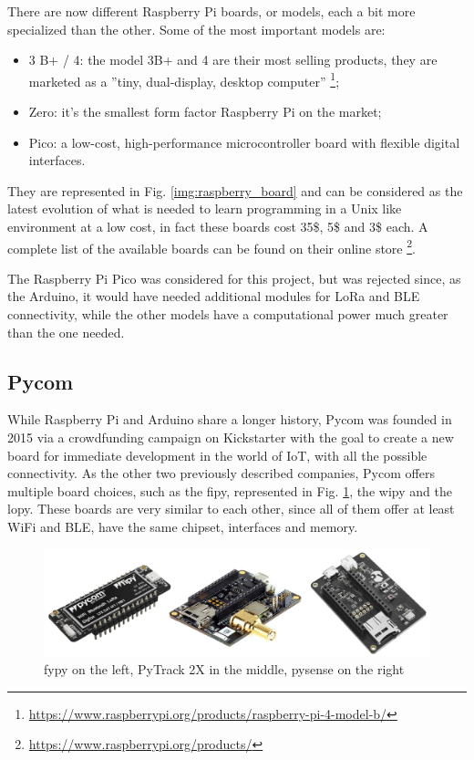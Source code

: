 		There are now different Raspberry Pi boards, or models, each a bit more specialized than the other.
		Some of the most important models are:
		\begin{itemize}[noitemsep]
			\item 3 B+ / 4: the model 3B+ and 4 are their most selling products, they are marketed as a ''tiny, dual-display, desktop computer'' \footnote{\url{https://www.raspberrypi.org/products/raspberry-pi-4-model-b/}};
			\item Zero: it's the smallest form factor Raspberry Pi on the market;
			\item Pico: a low-cost, high-performance microcontroller board with flexible digital interfaces.
		\end{itemize}
		
		They are represented in Fig. \ref{img:raspberry_board} and can be considered as the latest evolution of what is needed to learn programming in a Unix like environment at a low cost, in fact these boards cost 35\$, 5\$ and 3\$ each.
		A complete list of the available boards can be found on their online store \footnote{\url{https://www.raspberrypi.org/products/}}.
		
		The Raspberry Pi Pico was considered for this project, but was rejected since, as the Arduino, it would have needed additional modules for LoRa and BLE connectivity, while the other models have a computational power much greater than the one needed.
			
	\subsection{Pycom}
		
		While Raspberry Pi and Arduino share a longer history, Pycom was founded in 2015 via a crowdfunding campaign on Kickstarter with the goal to create a new board for immediate development in the world of IoT, with all the possible connectivity.
		As the other two previously described companies, Pycom offers multiple board choices, such as the fipy, represented in Fig. \ref{img:pycom_board}, the wipy and the lopy.
		These boards are very similar to each other, since all of them offer at least WiFi and BLE, have the same chipset, interfaces and memory.
		
		\begin{figure}[H]
			\centering
			\includegraphics[width=\textwidth]{resources/img/chap3/pycom_board}
			\caption{fypy on the left, PyTrack 2X in the middle, pysense on the right}
			\label{img:pycom_board}
		\end{figure}	
		
